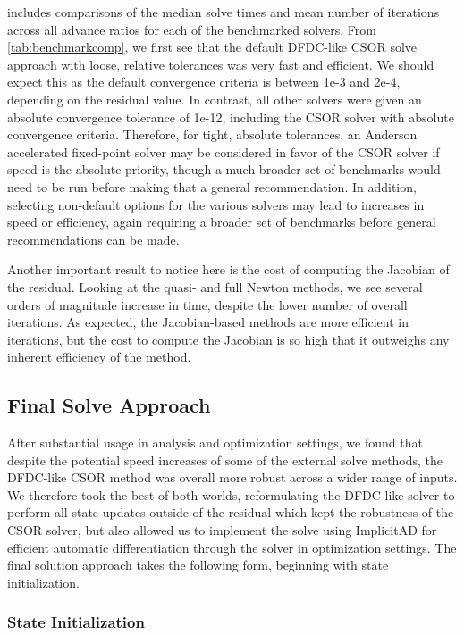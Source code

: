  includes comparisons of the median solve times and mean number of iterations across all advance ratios for each of the benchmarked solvers.
%
From \cref{tab:benchmarkcomp}, we first see that the default DFDC-like CSOR solve approach with loose, relative tolerances was very fast and efficient.
%
We should expect this as the default convergence criteria is between 1e-3 and 2e-4, depending on the residual value. %
%
In contrast, all other solvers were given an absolute convergence tolerance of 1e-12, including the CSOR solver with absolute convergence criteria. %
%
Therefore, for tight, absolute tolerances, an Anderson accelerated fixed-point solver may be considered in favor of the CSOR solver if speed is the absolute priority, though a much broader set of benchmarks would need to be run before making that a general recommendation.
%
In addition, selecting non-default options for the various solvers may lead to increases in speed or efficiency, again requiring a broader set of benchmarks before general recommendations can be made.


Another important result to notice here is the cost of computing the Jacobian of the residual.
%
Looking at the quasi- and full Newton methods, we see several orders of magnitude increase in time, despite the lower number of overall iterations.
%
As expected, the Jacobian-based methods are more efficient in iterations, but the cost to compute the Jacobian is so high that it outweighs any inherent efficiency of the method.

\subsection{Final Solve Approach}

After substantial usage in analysis and optimization settings, we found that despite the potential speed increases of some of the external solve methods, the DFDC-like CSOR method was overall more robust across a wider range of inputs.
%
We therefore took the best of both worlds, reformulating the DFDC-like solver to perform all state updates outside of the residual which kept the robustness of the CSOR solver, but also allowed us to implement the solve using ImplicitAD for efficient automatic differentiation through the solver in optimization settings.
%
The final solution approach takes the following form, beginning with state initialization.

\subsubsection{State Initialization}
\label{sssec:dfdcinit}


